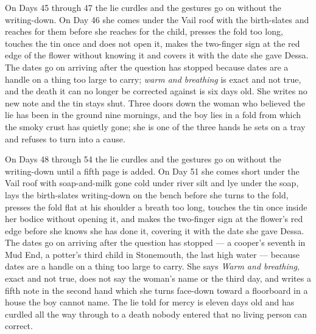 \documentclass{design/chronicle}
\begin{document}
{On Days 45 through 47 the lie curdles and the gestures go on without the writing-down. On Day 46 she comes under the Vail roof with the birth-slates and reaches for them before she reaches for the child, presses the fold too long, touches the tin once and does not open it, makes the two-finger sign at the red edge of the flower without knowing it and covers it with the date she gave Dessa. The dates go on arriving after the question has stopped because dates are a handle on a thing too large to carry; \emph{warm and breathing} is exact and not true, and the death it can no longer be corrected against is six days old. She writes no new note and the tin stays shut. Three doors down the woman who believed the lie has been in the ground nine mornings, and the boy lies in a fold from which the smoky crust has quietly gone; she is one of the three hands he sets on a tray and refuses to turn into a cause.

On Days 48 through 54 the lie curdles and the gestures go on without the writing-down until a fifth page is added. On Day 51 she comes short under the Vail roof with soap-and-milk gone cold under river silt and lye under the soap, lays the birth-slates writing-down on the bench before she turns to the fold, presses the fold flat at his shoulder a breath too long, touches the tin once inside her bodice without opening it, and makes the two-finger sign at the flower’s red edge before she knows she has done it, covering it with the date she gave Dessa. The dates go on arriving after the question has stopped --- a cooper’s seventh in Mud End, a potter’s third child in Stonemouth, the last high water --- because dates are a handle on a thing too large to carry. She says \emph{Warm and breathing}, exact and not true, does not say the woman’s name or the third day, and writes a fifth note in the second hand which she turns face-down toward a floorboard in a house the boy cannot name. The lie told for mercy is eleven days old and has curdled all the way through to a death nobody entered that no living person can correct.

}
\end{document}
